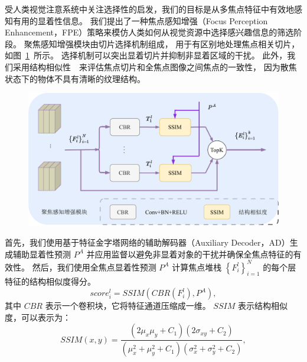 %
%
%
%
受人类视觉注意系统中关注选择性的启发，我们的目标是从多焦点特征中有效地感知有用的显着性信息。 我们提出了一种焦点感知增强（Focus Perception Enhancement，FPE）策略来模仿人类如何从视觉资源中选择感兴趣信息的筛选阶段。 
聚焦感知增强模块由切片选择机制组成，
用于有区别地处理焦点相关切片，
如图~\ref{cpt3_fig1:fpe}~所示。
选择机制可以突出显着切片并抑制非显着区域的干扰。 
此外，我们采用结构相似性~\cite{wang2003multiscale}~来评估焦点切片和全焦点图像之间焦点的一致性，
因为散焦状态下的物体不具有清晰的纹理结构。 
%
%
%
%
\begin{figure}[!ht]
	\centering
	\includegraphics[width=0.90\linewidth]{figures/chapter3/fpe}
	\label{cpt3_fig1:fpe}
\end{figure}
%
%
%
%
\par
%
%
首先，我们使用基于特征金字塔网络的辅助解码器（Auxiliary Decoder，AD）生成辅助显着性预测 $ P^{A} $ 并应用监督以避免非显着对象的干扰并确保全焦点特征的有效性。 然后，我们使用全焦点显着性预测 $ P^{A} $ 计算焦点堆栈 $ \left \{ F_{i}^{l} \right \}_{i=1}^{N} $ 的每个层特征的结构相似度得分。 
\begin{equation}
	score_{i}^{l} = SSIM \left ( CBR \left ( F_{i}^{l} \right ), P^{A} \right ),
\end{equation}
%
%
其中 $CBR$ 表示一个卷积块，它将特征通道压缩成一维。 $SSIM$ 表示结构相似度，可以表示为： 
%
%
\begin{equation} 	
	SSIM(x,y)=\frac{\left ( 2\mu_{x}\mu_{y}+C_{1} \right ) \left (  2\sigma_{xy}+C_{2} \right )  } 	
	{\left ( \mu_{x}^{2} + \mu_{y}^{2}+C_{1}\right ) \left ( \sigma_{x}^{2}+ \sigma_{y}^{2} + C_{2} \right ) } , 	
\end{equation}

